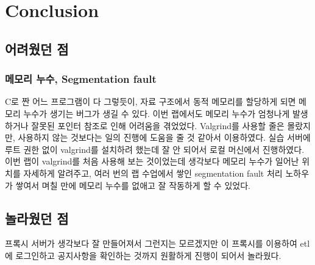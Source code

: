 \documentclass{report}
\begin{document}
\section{Conclusion}
\subsection{어려웠던 점}
\subsubsection{메모리 누수, Segmentation fault}
C로 짠 어느 프로그램이 다 그렇듯이, 자료 구조에서 동적 메모리를 할당하게 되면 메모리 누수가 생기는 버그가 생길 수 있다. 이번 랩에서도 메모리 누수가 엄청나게 발생하거나 잘못된 포인터 참조로 인해 어려움을 겪었었다. Valgrind를 사용할 줄은 몰랐지만, 사용하지 않는 것보다는 일의 진행에 도움을 줄 것 같아서 이용하였다. 실습 서버에 루트 권한 없이 valgrind를 설치하려 했는데 잘 안 되어서 로컬 머신에서 진행하였다. 이번 랩이 valgrind를 처음 사용해 보는 것이었는데 생각보다 메모리 누수가 일어난 위치를 자세하게 알려주고, 여러 번의 랩 수업에서 쌓인 segmentation fault 처리 노하우가 쌓여서 며칠 만에 메모리 누수를 없애고 잘 작동하게 할 수 있었다. 

\subsection{놀라웠던 점}
프록시 서버가 생각보다 잘 만들어져서 그런지는 모르겠지만 이 프록시를 이용하여 etl에 로그인하고 공지사항을 확인하는 것까지 원활하게 진행이 되어서 놀라웠다.
\end{document}
